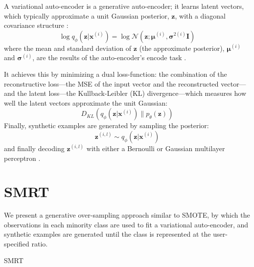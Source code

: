 \documentclass[twoside,11pt]{article}
\begin{document}
A variational auto-encoder is a generative auto-encoder; it learns latent vectors, which typically approximate a unit Gaussian posterior, $\mathbf{z}$, with a diagonal covariance structure \citep{kingma2013auto}:
\[
    \log q_{\phi}(\mathbf{z}|\mathbf{x}^{(i)}) = \log \mathcal{N}(\mathbf{z}; \bm{\mu}^{(i)}, \bm{\sigma}^{2(i)}\mathbf{I})
\]
where the mean and standard deviation of $\mathbf{z}$ (the approximate posterior), $\bm{\mu}^{(i)}$ and $\bm{\sigma}^{(i)}$, are the results of the auto-encoder's encode task \citep{kingma2013auto}.

It achieves this by minimizing a dual loss-function: the combination of the reconstructive loss---the MSE of the input vector and the reconstructed vector---and the latent loss---the Kullback-Leibler (KL) divergence---which measures how well the latent vectors approximate the unit Gaussian:
\[
    D_{KL}(q_{\phi}(\mathbf{z}|\mathbf{x}^{(i)})\parallel p_{\theta}(\mathbf{z}))
\]
Finally, synthetic examples are generated by sampling the posterior:
\[
    \mathbf{z}^{(i,l)} \sim q_{\phi}(\mathbf{z}|\mathbf{x}^{(i)})
\]
and finally decoding $\mathbf{z}^{(i,l)}$ with either a Bernoulli or Gaussian multilayer perceptron \citep{kingma2013auto}.


\section{SMRT}

We present a generative over-sampling approach similar to SMOTE, by which the observations in each minority class are used to fit a variational auto-encoder, and synthetic examples are generated until the class is represented at the user-specified ratio. \\

\makeatletter
\def\BState{\State\hskip-\ALG@thistlm}
\makeatother

\begin{algorithm}
\caption{SMRT}\label{smrt}
\end{algorithm}
\end{document}
